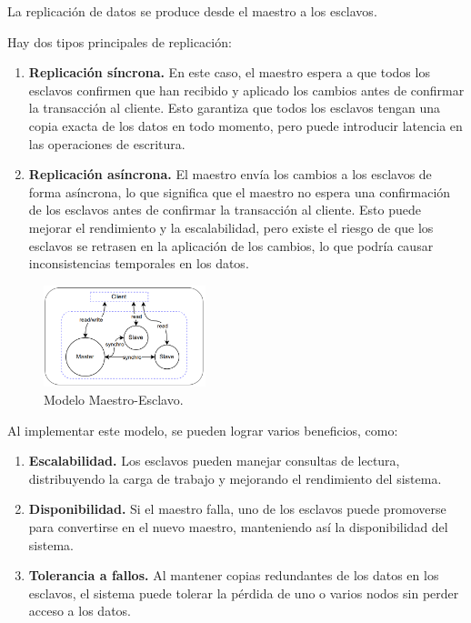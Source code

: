 \documentclass[pdflatex,sn-mathphys-num]{sn-jnl}
\theoremstyle{thmstyleone}%
\theoremstyle{thmstyletwo}%
\theoremstyle{thmstylethree}%
\begin{document}
La replicación de datos se produce desde el maestro a los esclavos. 

Hay dos tipos principales de replicación:

\begin{enumerate}
    \item \textbf{Replicación síncrona.} En este caso, el maestro espera a que todos los esclavos confirmen que han recibido y aplicado los cambios antes de confirmar la transacción al cliente. Esto garantiza que todos los esclavos tengan una copia exacta de los datos en todo momento, pero puede introducir latencia en las operaciones de escritura.
    
    \item \textbf{Replicación asíncrona.} El maestro envía los cambios a los esclavos de forma asíncrona, lo que significa que el maestro no espera una confirmación de los esclavos antes de confirmar la transacción al cliente. Esto puede mejorar el rendimiento y la escalabilidad, pero existe el riesgo de que los esclavos se retrasen en la aplicación de los cambios, lo que podría causar inconsistencias temporales en los datos.
\end{enumerate}

\begin{figure}
    \centering
    \includegraphics[width=0.42\textwidth]{figs/maestro-esclavo.png}
    \caption{Modelo Maestro-Esclavo.}
\end{figure}

Al implementar este modelo, se pueden lograr varios beneficios, como:

\begin{enumerate}
    \item \textbf{Escalabilidad.} Los esclavos pueden manejar consultas de lectura, distribuyendo la carga de trabajo y mejorando el rendimiento del sistema.

    \item \textbf{Disponibilidad.} Si el maestro falla, uno de los esclavos puede promoverse para convertirse en el nuevo maestro, manteniendo así la disponibilidad del sistema.

    \item \textbf{Tolerancia a fallos.} Al mantener copias redundantes de los datos en los esclavos, el sistema puede tolerar la pérdida de uno o varios nodos sin perder acceso a los datos.
\end{enumerate}
\end{document}
